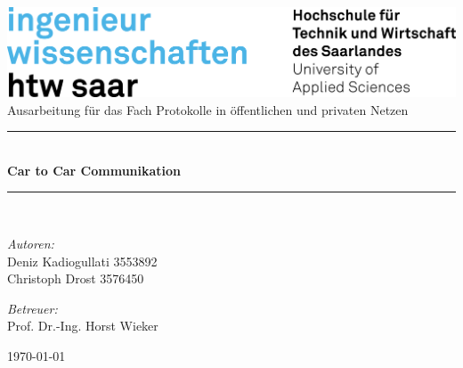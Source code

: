 \documentclass[12pt, a4paper, twoside, openright,ngerman]{scrreprt}
\begin{document}
\begin{titlepage}
		\begin{center}
			\includegraphics[width=.8\linewidth]{content/images/logos/logo_htw.png}\\[1cm]   
			
			\vspace{10 mm}
			Ausarbeitung für das Fach \glqq Protokolle in öffentlichen und privaten Netzen\grqq 
			\vspace{10 mm}	
			
			\newcommand{\HRule}{\rule{\linewidth}{0.5mm}} \HRule \\[0.4cm] { \huge \bfseries Car to Car Communikation}\\[0.4cm]
			\HRule \\[1.5cm]

			\begin{minipage}{0.4\textwidth}
				\begin{flushleft} \large
					\emph{Autoren:}\\
					Deniz Kadiogullati 3553892\\
					Christoph Drost 3576450
				\end{flushleft}
			\end{minipage}
			\hfill
			\begin{minipage}{0.4\textwidth}
				\begin{flushright} \large
					\emph{Betreuer:} \\
					Prof. Dr.-Ing. Horst Wieker
				\end{flushright}
			\end{minipage}
			\vfill
			{\large \today}
		\end{center}
	\end{titlepage}


\listoftodos

\tableofcontents
\newpage 

\cleardoublepage




\cleardoublepage
\label{abkuerzungsverzeichnis}
\begin{acronym}[LONGEST]
	
\end{acronym}   	 		

\nocite{*} 

\newpage
\sloppy
\printbibliography 



\newpage
\listoffigures
\end{document}

